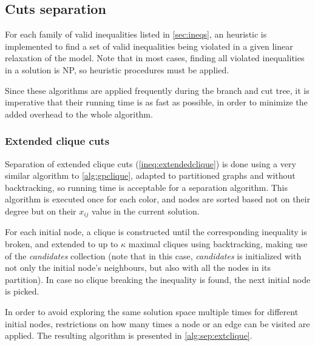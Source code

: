 \subsection{Cuts separation}

For each family of valid inequalities listed in \ref{sec:ineqs}, an heuristic is implemented to find a set of valid inequalities being violated in a given linear relaxation of the model. Note that in most cases, finding all violated inequalities in a solution is NP, so heuristic procedures must be applied. 

Since these algorithms are applied frequently during the branch and cut tree, it is imperative that their running time is as fast as possible, in order to minimize the added overhead to the whole algorithm.

\subsubsection{Extended clique cuts}

Separation of extended clique cuts (\ref{ineq:extendedclique}) is done using a very similar algorithm to \ref{alg:gpclique}, adapted to partitioned graphs and without backtracking, so running time is acceptable for a separation algorithm. This algorithm is executed once for each color, and nodes are sorted based not on their degree but on their $x_{ij}$ value in the current solution.

For each initial node, a clique is constructed until the corresponding inequality is broken, and extended to up to $\kappa$ maximal cliques using backtracking, making use of the \textit{candidates} collection (note that in this case, \textit{candidates} is initialized with not only the initial node's neighbours, but also with all the nodes in its partition). In case no clique breaking the inequality is found, the next initial node is picked.

In order to avoid exploring the same solution space multiple times for different initial nodes, restrictions on how many times a node or an edge can be visited are applied. The resulting algorithm is presented in \ref{alg:sep:extclique}.

